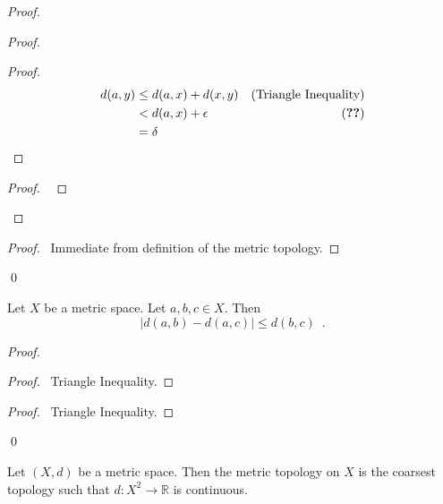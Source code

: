 \begin{proof}
\pf
{}
\begin{proof}
	\begin{proof}
		\pf
		\begin{align*}
			d(a,y) & \leq d(a,x) + d(x,y) & (\text{Triangle Inequality}) \\
			& < d(a,x) + \epsilon & (\text{\stepref{e}}) \\
			& = \delta
		\end{align*}
	\end{proof}
	\begin{proof}
		\pf\ 
	\end{proof}
\end{proof}
\begin{proof}
	\pf\ Immediate from definition of the metric topology.
\end{proof}
\qed
\end{proof}

\begin{prop}
\label{prop:distance_between_distances}
Let $X$ be a metric space. Let $a,b,c \in X$. Then
\[ |d(a,b) - d(a,c)| \leq d(b,c) \enspace . \]
\end{prop}

\begin{proof}
\pf
{}
\begin{proof}
	\pf\ Triangle Inequality.
\end{proof}
\begin{proof}
	\pf\ Triangle Inequality.
\end{proof}
\qed
\end{proof}

\begin{prop}
Let $(X,d)$ be a metric space. Then the metric topology on $X$ is the coarsest topology such that $d : X^2 \rightarrow \mathbb{R}$ is continuous.
\end{prop}

